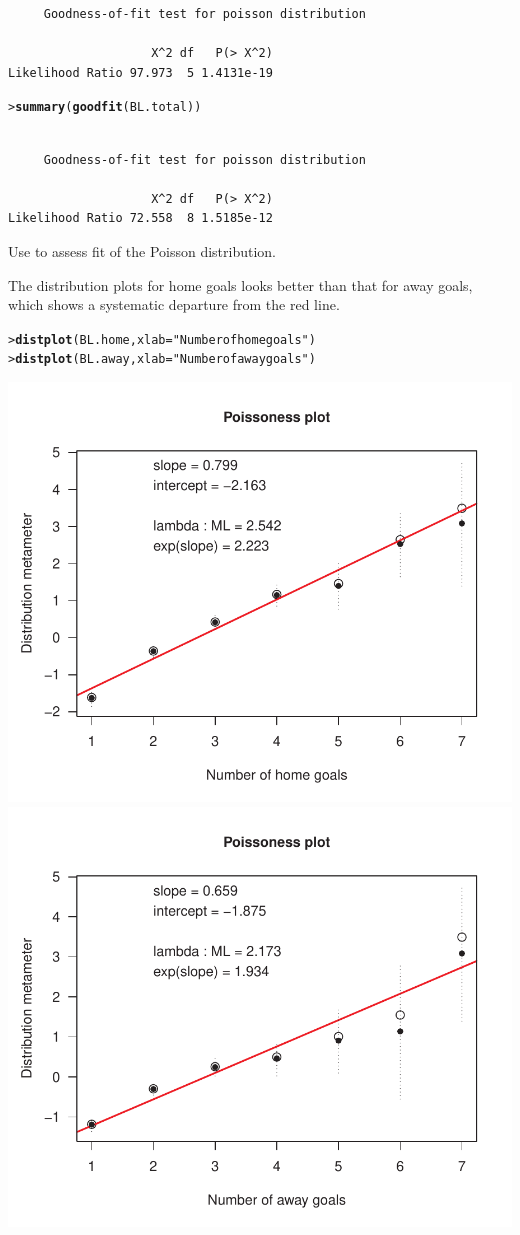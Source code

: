 \documentclass[10pt]{report}\usepackage[]{graphicx}\usepackage[]{color}
\makeatletter
\newcommand{\hlstr}[1]{\textcolor[rgb]{0.192,0.494,0.8}{#1}}%
\newcommand{\hlstd}[1]{\textcolor[rgb]{0.345,0.345,0.345}{#1}}%
\newcommand{\hlkwc}[1]{\textcolor[rgb]{0.333,0.667,0.333}{#1}}%
\newcommand{\hlkwd}[1]{\textcolor[rgb]{0.737,0.353,0.396}{\textbf{#1}}}%
\newenvironment{kframe}{%
 \def\at@end@of@kframe{}%
 \ifinner\ifhmode%
  \def\at@end@of@kframe{\end{minipage}}%
  \begin{minipage}{\columnwidth}%
 \fi\fi%
 \def\FrameCommand##1{\hskip\@totalleftmargin \hskip-\fboxsep
 \colorbox{shadecolor}{##1}\hskip-\fboxsep
     \hskip-\linewidth \hskip-\@totalleftmargin \hskip\columnwidth}%
 \MakeFramed {\advance\hsize-\width
   \@totalleftmargin\z@ \linewidth\hsize
   \@setminipage}}%
 {\par\unskip\endMakeFramed%
 \at@end@of@kframe}
\newenvironment{knitrout}{}{} %
\renewenvironment{knitrout}{\small\renewcommand{\baselinestretch}{.85}}{} %
\makeatother
\begin{document}
\begin{Exercises}
\begin{enumerate*}
\begin{ans}
\begin{knitrout}
\begin{kframe}
\begin{verbatim}
	 Goodness-of-fit test for poisson distribution

                    X^2 df   P(> X^2)
Likelihood Ratio 97.973  5 1.4131e-19
\end{verbatim}
\begin{alltt}
\hlstd{> }\hlkwd{summary}\hlstd{(}\hlkwd{goodfit}\hlstd{(BL.total))}
\end{alltt}
\begin{verbatim}

	 Goodness-of-fit test for poisson distribution

                    X^2 df   P(> X^2)
Likelihood Ratio 72.558  8 1.5185e-12
\end{verbatim}
\end{kframe}
\end{knitrout}
    \end{ans}
    
    \item Use  to assess fit of the Poisson distribution.
    \begin{ans}
    The distribution plots for home goals looks better than that for away goals, which shows
    a systematic departure from the red line.
\begin{knitrout}\footnotesize
{}\color{fgcolor}\begin{kframe}
\begin{alltt}
\hlstd{> }\hlkwd{distplot}\hlstd{(BL.home,} \hlkwc{xlab}\hlstd{=}\hlstr{"Number of home goals"}\hlstd{)}
\hlstd{> }\hlkwd{distplot}\hlstd{(BL.away,} \hlkwc{xlab}\hlstd{=}\hlstr{"Number of away goals"}\hlstd{)}
\end{alltt}
\end{kframe}

\centerline{\includegraphics[width=.5\textwidth]{soln/fig/ex3_8c-1} 
\includegraphics[width=.5\textwidth]{soln/fig/ex3_8c-2} }




\end{knitrout}
\end{ans}
\end{enumerate*}
\end{Exercises}
\end{document}
